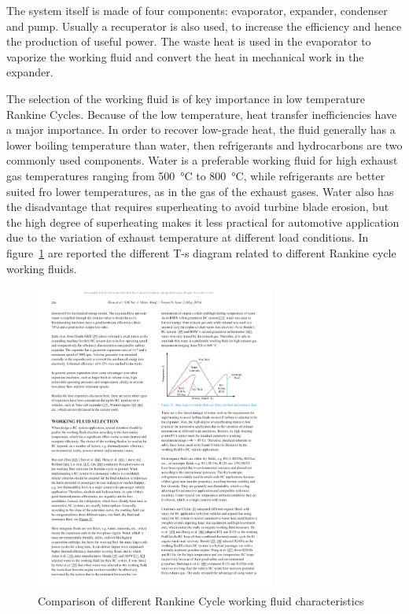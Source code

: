 The system itself is made of four components: evaporator, expander, condenser and pump. Usually a recuperator is also used, to increase the efficiency and hence the production of useful power. The waste heat is used in the evaporator to vaporize the working fluid and convert the heat in mechanical work in the expander.

The selection of the working fluid is of key importance in low temperature Rankine Cycles. Because of the low temperature, heat transfer inefficiencies have a major importance. In order to recover low-grade heat, the fluid generally has a lower boiling temperature than water, then refrigerants and hydrocarbons are two commonly used components. Water is a preferable working fluid for high exhaust gas temperatures ranging from \SI{500}{\celsius} to \SI{800}{\celsius}, while refrigerants are better suited fro lower temperatures, as in the gas of the exhaust gases. Water also has the disadvantage that requires superheating to avoid turbine blade erosion, but the high degree of superheating makes it less practical for automotive application due to the variation of exhaust temperature at different load conditions. In figure~\ref{fig:orc_working_fluids} are reported the different T-s diagram related to different Rankine cycle working fluids.

\begin{figure}[ht]
  \centering
  \includegraphics[width=0.7\textwidth]{figures/review/orc_working_fluids.pdf}
  \caption{Comparison of different Rankine Cycle working fluid characteristics\label{fig:orc_working_fluids} }
\end{figure}

